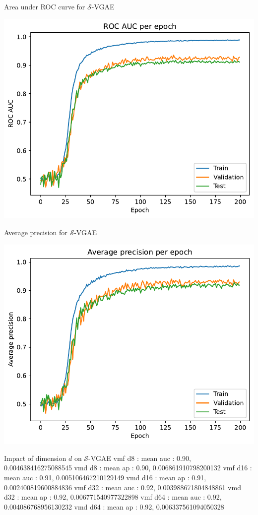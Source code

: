 \begin{frame}{Area under ROC curve for $\mathcal{S}$-VGAE}
  \begin{center}
    \includegraphics[width=.8\hsize]{figures/vMF_auc.pdf}
  \end{center}
\end{frame}

\begin{frame}{Average precision for $\mathcal{S}$-VGAE}
  \begin{center}
    \includegraphics[width=.8\hsize]{figures/vMF_ap.pdf}
  \end{center}
\end{frame}

\begin{frame}{Impact of dimension $d$ on $\mathcal{S}$-VGAE}
  vmf d8 : mean auc : 0.90, 0.004638416275088545
  vmd d8 : mean ap : 0.90, 0.006861910798200132
  vmf d16 : mean auc : 0.91, 0.005106467210129149
  vmd d16 : mean ap : 0.91, 0.002400819600884836
  vmf d32 : mean auc : 0.92, 0.003988671804848861
  vmd d32 : mean ap : 0.92, 0.006771540977322898
  vmf d64 : mean auc : 0.92, 0.004086768956130232
  vmd d64 : mean ap : 0.92, 0.006337561094050328
\end{frame}